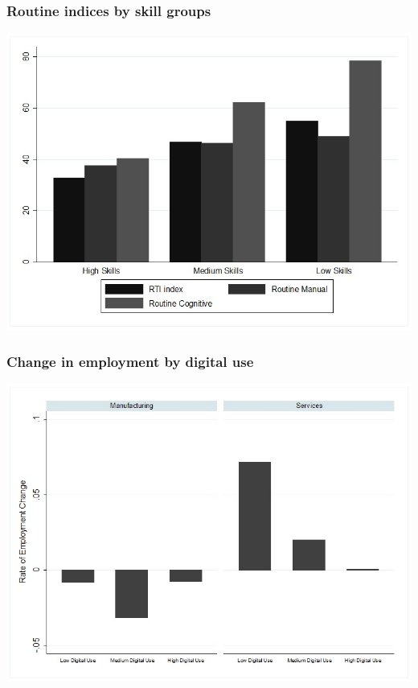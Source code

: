 \documentclass[10pt,xcolor={usenames,dvipsnames}]{beamer}
\begin{document}
\begin{frame}
\frametitle{Routine indices by skill groups}
\centering
\includegraphics[width=\linewidth,height=0.8\textheight,keepaspectratio]{Figures/4_routine_skills.jpg}
\end{frame}



\begin{frame}
\frametitle{Change in employment by digital use}
\centering
\includegraphics[width=\linewidth,height=0.8\textheight,keepaspectratio]{Figures/7_employment_digital_use.jpg}
\end{frame}
\end{document}
